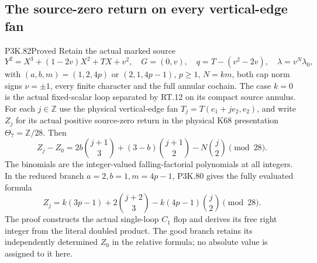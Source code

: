 \subsection{The source-zero return on every vertical-edge fan}
\begin{statement}{P3K.82}{Proved}
Retain the actual marked source
\[
 Y^2=X^3+(1-2v)X^2+TX+v^2,\quad G=(0,v),\quad
 q=T-(v^2-2v),\quad\lambda=v^{N}\lambda_0,
\]
with \((a,b,m)=(1,2,4p)\) or \((2,1,4p-1)\), \(p\ge1\),
\(N=km\), both cap norm signs \(\nu=\pm1\), every finite character
and the full annular cochain. The case \(k=0\) is the actual fixed-scalar
loop separated by RT.12 on its compact source annulus. For each
\(j\in\mathbb Z\) use the physical vertical-edge fan
\(T_j=T(e_1+je_2,e_2)\), and write \(Z_j\) for its actual positive
source-zero return in the physical K68 presentation \(\Theta_7=\mathbb Z/28\).
Then
\[
 Z_j-Z_0=2b\binom{j+1}{3}+(3-b)\binom{j+1}{2}
                            -N\binom j2\pmod {28}. \tag{ZV.1}
\]
The binomials are the integer-valued falling-factorial polynomials at
all integers. In the reduced branch \(a=2,b=1,m=4p-1\), P3K.80 gives
the fully evaluated formula
\[
 Z_j=k(3p-1)+2\binom{j+2}{3}
                  -k(4p-1)\binom j2\pmod {28}.       \tag{ZV.2}
\]
The proof constructs the actual single-loop \(C_1\) flop and derives
its free right integer from the literal doubled product. The good
branch retains its independently determined \(Z_0\) in the relative
formula; no absolute value is assigned to it here.
\end{statement}
